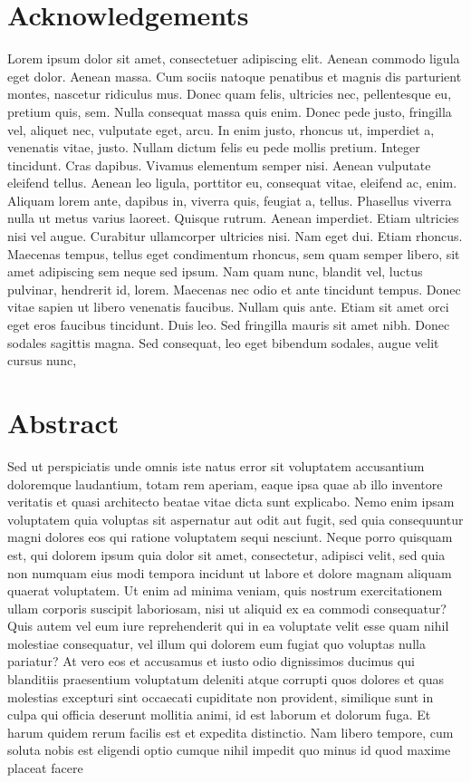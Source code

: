 \section*{Acknowledgements}

Lorem ipsum dolor sit amet, consectetuer adipiscing elit. Aenean commodo ligula 
eget dolor. Aenean massa. Cum sociis natoque penatibus et magnis dis parturient 
montes, nascetur ridiculus mus. Donec quam felis, ultricies nec, pellentesque 
eu, pretium quis, sem. Nulla consequat massa quis enim. Donec pede justo, 
fringilla vel, aliquet nec, vulputate eget, arcu. In enim justo, rhoncus ut, 
imperdiet a, venenatis vitae, justo. Nullam dictum felis eu pede mollis pretium. 
Integer tincidunt. Cras dapibus. Vivamus elementum semper nisi. Aenean vulputate 
eleifend tellus. Aenean leo ligula, porttitor eu, consequat vitae, eleifend ac, 
enim. Aliquam lorem ante, dapibus in, viverra quis, feugiat a, tellus. Phasellus 
viverra nulla ut metus varius laoreet. Quisque rutrum. Aenean imperdiet. Etiam 
ultricies nisi vel augue. Curabitur ullamcorper ultricies nisi. Nam eget dui. 
Etiam rhoncus. Maecenas tempus, tellus eget condimentum rhoncus, sem quam semper 
libero, sit amet adipiscing sem neque sed ipsum. Nam quam nunc, blandit vel, 
luctus pulvinar, hendrerit id, lorem. Maecenas nec odio et ante tincidunt 
tempus. Donec vitae sapien ut libero venenatis faucibus. Nullam quis ante. Etiam 
sit amet orci eget eros faucibus tincidunt. Duis leo. Sed fringilla mauris sit 
amet nibh. Donec sodales sagittis magna. Sed consequat, leo eget bibendum 
sodales, augue velit cursus nunc, 

\clearpage
\section*{Abstract}

Sed ut perspiciatis unde omnis iste natus error sit voluptatem accusantium 
doloremque laudantium, totam rem aperiam, eaque ipsa quae ab illo inventore 
veritatis et quasi architecto beatae vitae dicta sunt explicabo. Nemo enim ipsam 
voluptatem quia voluptas sit aspernatur aut odit aut fugit, sed quia 
consequuntur magni dolores eos qui ratione voluptatem sequi nesciunt. Neque 
porro quisquam est, qui dolorem ipsum quia dolor sit amet, consectetur, adipisci 
velit, sed quia non numquam eius modi tempora incidunt ut labore et dolore 
magnam aliquam quaerat voluptatem. Ut enim ad minima veniam, quis nostrum 
exercitationem ullam corporis suscipit laboriosam, nisi ut aliquid ex ea commodi 
consequatur? Quis autem vel eum iure reprehenderit qui in ea voluptate velit 
esse quam nihil molestiae consequatur, vel illum qui dolorem eum fugiat quo 
voluptas nulla pariatur? At vero eos et accusamus et iusto odio dignissimos 
ducimus qui blanditiis praesentium voluptatum deleniti atque corrupti quos 
dolores et quas molestias excepturi sint occaecati cupiditate non provident, 
similique sunt in culpa qui officia deserunt mollitia animi, id est laborum et 
dolorum fuga. Et harum quidem rerum facilis est et expedita distinctio. Nam 
libero tempore, cum soluta nobis est eligendi optio cumque nihil impedit quo 
minus id quod maxime placeat facere 

